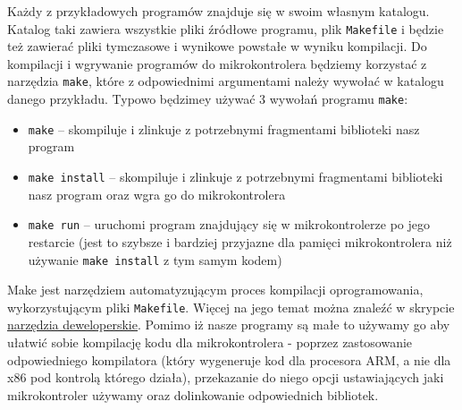 \begin{ProTip}{}
Każdy z przykładowych programów znajduje się w swoim własnym katalogu. Katalog taki zawiera wszystkie pliki źródłowe programu, plik \Verb#Makefile# i będzie też zawierać pliki tymczasowe i wynikowe powstałe w wyniku kompilacji.
Do kompilacji i wgrywanie programów do mikrokontrolera będziemy korzystać z narzędzia \Verb$make$, które z odpowiednimi argumentami należy wywołać w katalogu danego przykładu. Typowo będzimey używać 3 wywołań programu \Verb$make$:
\begin{itemize}
\item \Verb$make$ – skompiluje i zlinkuje z potrzebnymi fragmentami biblioteki nasz program
\item \Verb$make install$ – skompiluje i zlinkuje z potrzebnymi fragmentami biblioteki nasz program oraz wgra go do mikrokontrolera
\item \Verb$make run$ – uruchomi program znajdujący się w mikrokontrolerze po jego restarcie (jest to szybsze i bardziej przyjazne dla pamięci mikrokontrolera niż używanie \Verb$make install$ z tym samym kodem)
\end{itemize}

\vspace{5mm}

Make jest narzędziem automatyzującym proces kompilacji oprogramowania, wykorzystującym pliki \Verb#Makefile#. Więcej na jego temat można znaleźć w skrypcie \href{http://www.opcode.eu.org/Narzędzia\_deweloperskie.pdf}{narzędzia deweloperskie}. Pomimo iż nasze programy są małe to używamy go aby ułatwić sobie kompilację kodu dla mikrokontrolera - poprzez zastosowanie odpowiedniego kompilatora (który wygeneruje kod dla procesora ARM, a nie dla x86 pod kontrolą którego działa), przekazanie do niego opcji ustawiających jaki mikrokontroler używamy oraz dolinkowanie odpowiednich bibliotek.
\end{ProTip}

